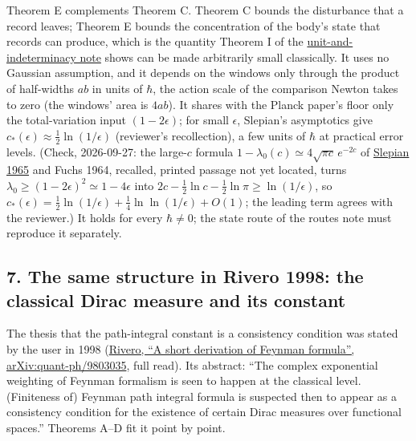 \documentclass[11pt,a4paper]{article}
\begin{document}
Theorem E complements Theorem C. Theorem C bounds the disturbance that a
record leaves; Theorem E bounds the concentration of the body's state
that records can produce, which is the quantity Theorem I of the
\href{necessity-unit-and-indeterminacy.md}{unit-and-indeterminacy note}
shows can be made arbitrarily small classically. It uses no Gaussian
assumption, and it depends on the windows only through the product of
half-widths \(ab\) in units of \(\hbar\), the action scale of the
comparison Newton takes to zero (the windows' area is \(4ab\)). It
shares with the Planck paper's floor only the total-variation input
\((1-2\epsilon)\); for small \(\epsilon\), Slepian's asymptotics give
\(c_*(\epsilon)\approx\frac12\ln(1/\epsilon)\) (reviewer's
recollection), a few units of \(\hbar\) at practical error levels.
(Check, 2026-09-27: the large-\(c\) formula
\(1-\lambda_0(c)\simeq4\sqrt{\pi c}\,e^{-2c}\) of
\href{https://doi.org/10.1002/sapm196544199}{Slepian 1965} and Fuchs
1964, recalled, printed passage not yet located, turns
\(\lambda_0\ge(1-2\epsilon)^2\simeq1-4\epsilon\) into
\(2c-\frac12\ln c-\frac12\ln\pi\ge\ln(1/\epsilon)\), so
\(c_*(\epsilon)=\frac12\ln(1/\epsilon)+\frac14\ln\ln(1/\epsilon)+O(1)\);
the leading term agrees with the reviewer.) It holds for every
\(\hbar\ne0\); the state route of the routes note must reproduce it
separately.

\hypertarget{the-same-structure-in-rivero-1998-the-classical-dirac-measure-and-its-constant}{%
\subsection{7. The same structure in Rivero 1998: the classical Dirac
measure and its
constant}\label{the-same-structure-in-rivero-1998-the-classical-dirac-measure-and-its-constant}}

The thesis that the path-integral constant is a consistency condition
was stated by the user in 1998
(\href{https://arxiv.org/abs/quant-ph/9803035}{Rivero, ``A short
derivation of Feynman formula'', arXiv:quant-ph/9803035}, full read).
Its abstract: ``The complex exponential weighting of Feynman formalism
is seen to happen at the classical level. (Finiteness of) Feynman path
integral formula is suspected then to appear as a consistency condition
for the existence of certain Dirac measures over functional spaces.''
Theorems A--D fit it point by point.
\end{document}
